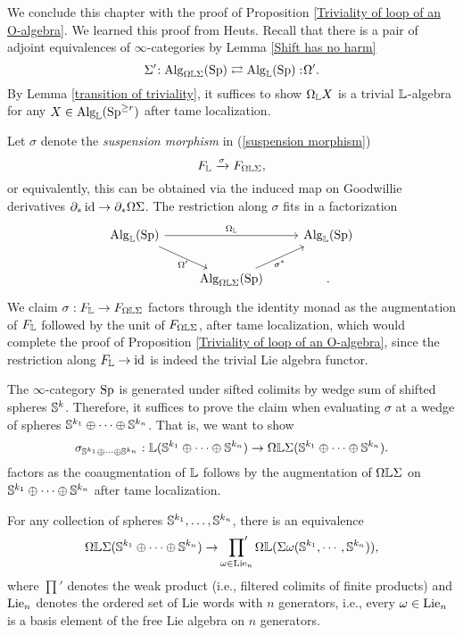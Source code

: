 We conclude this chapter with the proof of Proposition \ref{Triviality of loop of an O-algebra}.
We learned this proof from Heuts. 
Recall that there is a pair of adjoint equivalences of $\infty$-categories by Lemma \ref{Shift has no harm} 
$$
\Sigma'\negmedspace: \operatorname{Alg}_{\Omega {\mathbb{L}} \Sigma}(\operatorname{Sp}) \rightleftarrows \operatorname{Alg}_{{\mathbb{L}}}(\operatorname{Sp}):\negmedspace \Omega'.
$$
By Lemma \ref{transition of triviality},
it suffices to show $\Omega_{{\mathbb{L}}} X$ is a trivial ${\mathbb{L}}$-algebra for any $X\in \operatorname{Alg}_{{\mathbb{L}}}(\operatorname{Sp}^{\geq r})$ after tame localization.

Let $\sigma$ denote the \emph{suspension morphism} in (\ref{suspension morphism})
\[
F_{{\mathbb{L}}} \xrightarrow{\sigma} F_{\Omega {\mathbb{L}} \Sigma},
\]
or equivalently, this can be obtained via the induced map on Goodwillie derivatives
$\partial_{*}\operatorname{id} \to \partial_* \Omega \Sigma$.
The restriction along $\sigma$ fits in a factorization
\[
\begin{tikzcd}
	\Alg_{\BL}(\Sp) &   & \Alg_{\BL}(\Sp) \\
	&  \Alg_{\Omega \BL \Sigma}(\Sp) &
	\arrow[from=1-1, to = 1-3, "\Omega_{\BL}"]
	\arrow[from=1-1 , to =2-2, "\Omega'" below]
	\arrow[from=2-2, to=1-3, "\sigma^*" below].
\end{tikzcd}
\]
We claim $\sigma:F_{{\mathbb{L}}}\to F_{\Omega {\mathbb{L}} \Sigma}$ factors through the identity monad as the augmentation of $F_{{\mathbb{L}}}$ followed by the unit of $F_{\Omega {\mathbb{L}} \Sigma}$, after tame localization, which would complete the proof of Proposition \ref{Triviality of loop of an O-algebra},
since the restriction along $F_{\mathbb{L}} \to \operatorname{id}$ is indeed the trivial Lie algebra functor. 

The $\infty$-category $\operatorname{Sp}$ is generated under sifted colimits by wedge sum of shifted spheres ${\mathbb{S}}^k$.
Therefore, it suffices to prove the claim when evaluating $\sigma$ at a wedge of spheres
${\mathbb{S}}^{k_1}\oplus \cdots \oplus {\mathbb{S}}^{k_n}$.
That is, we want to show 
$$
\sigma_{{\mathbb{S}}^{k_1}\oplus \cdots \oplus {\mathbb{S}}^{k_n}}: 
{\mathbb{L}}({\mathbb{S}}^{k_1}\oplus \cdots \oplus {\mathbb{S}}^{k_n})
\to 
\Omega {\mathbb{L}} \Sigma ({\mathbb{S}}^{k_1}\oplus \cdots \oplus {\mathbb{S}}^{k_n}).
$$
factors as the coaugmentation of ${\mathbb{L}}$ follows by the augmentation of $\Omega {\mathbb{L}} \Sigma$ on ${\mathbb{S}}^{k_1}\oplus \cdots \oplus {\mathbb{S}}^{k_n}$ after tame localization.
\begin{theorem}
    For any collection of spheres ${\mathbb{S}}^{k_1}, \dots, {\mathbb{S}}^{k_n}$, there is an equivalence
    $$
    \Omega{\mathbb{L}}\Sigma({\mathbb{S}}^{k_1}\oplus \cdots \oplus {\mathbb{S}}^{k_n})
    \to 
    \sideset{}{'}\prod_{\omega \in \operatorname{Lie}_n} \Omega {\mathbb{L}} (\Sigma \omega({\mathbb{S}}^{k_1 }, \cdots, {\mathbb{S}}^{k_n })),
    $$
    where $\prod'$ denotes the weak product (i.e., filtered colimits of finite products) and $\operatorname{Lie}_n$ denotes the ordered set of Lie words with $n$ generators, i.e., every $\omega\in \operatorname{Lie}_n$ is a basis element of the free Lie algebra on $n$ generators.
\end{theorem}

